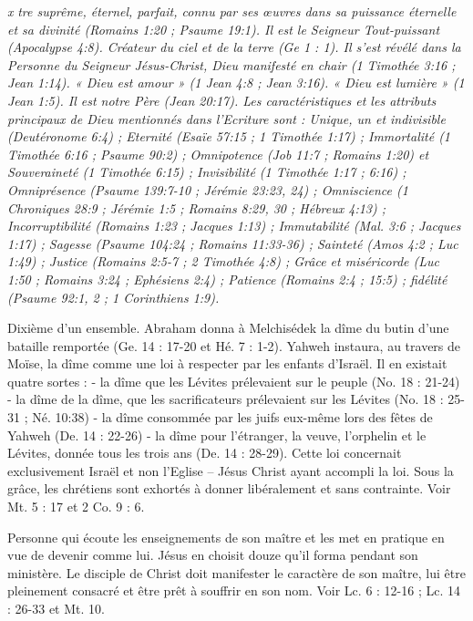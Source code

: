 \begin{multicols}{2}
\textit{x}\newline
{}\textit{tre suprême, éternel, parfait, connu par ses œuvres dans sa puissance éternelle et sa divinité (Romains 1:20 ; Psaume 19:1). Il est le Seigneur Tout-puissant (Apocalypse 4:8). Créateur du ciel et de la terre (Ge 1 : 1). Il s'est révélé dans la Personne du Seigneur Jésus-Christ, Dieu manifesté en chair (1 Timothée 3:16 ; Jean 1:14). « Dieu est amour » (1 Jean 4:8 ; Jean 3:16). « Dieu est lumière » (1 Jean 1:5). Il est notre Père (Jean 20:17). Les caractéristiques et les attributs principaux de Dieu mentionnés dans l'Ecriture sont : Unique, un et indivisible (Deutéronome 6:4) ; Eternité (Esaïe 57:15 ; 1 Timothée 1:17) ; Immortalité (1 Timothée 6:16 ; Psaume 90:2) ; Omnipotence (Job 11:7 ; Romains 1:20) et Souveraineté (1 Timothée 6:15) ; Invisibilité (1 Timothée 1:17 ; 6:16) ; Omniprésence (Psaume 139:7-10 ; Jérémie 23:23, 24) ; Omniscience (1 Chroniques 28:9 ; Jérémie 1:5 ; Romains 8:29, 30 ; Hébreux 4:13) ; Incorruptibilité (Romains 1:23 ; Jacques 1:13) ; Immutabilité (Mal. 3:6 ; Jacques 1:17) ; Sagesse (Psaume 104:24 ; Romains 11:33-36) ; Sainteté (Amos 4:2 ; Luc 1:49) ; Justice (Romains 2:5-7 ; 2 Timothée 4:8) ; Grâce et miséricorde (Luc 1:50 ; Romains 3:24 ; Ephésiens 2:4) ; Patience (Romains 2:4 ; 15:5) ; fidélité (Psaume 92:1, 2 ; 1 Corinthiens 1:9).}\newline

\textit{}\newline
Dixième d’un ensemble. Abraham donna à Melchisédek la dîme du butin d'une bataille remportée (Ge. 14 : 17-20 et Hé. 7 : 1-2). Yahweh instaura, au travers de Moïse, la dîme comme une loi à respecter par les enfants d’Israël. Il en existait quatre sortes :
- la dîme que les Lévites prélevaient sur le peuple (No. 18 : 21-24)
- la dîme de la dîme, que les sacrificateurs prélevaient sur les Lévites (No. 18 : 25-31 ; Né. 10:38)
- la dîme consommée par les juifs eux-même lors des fêtes de Yahweh (De. 14 : 22-26)
- la dîme pour l’étranger, la veuve, l’orphelin et le Lévites, donnée tous les trois ans (De. 14 : 28-29).
Cette loi concernait exclusivement Israël et non l’Eglise – Jésus Christ ayant accompli la loi. Sous la grâce, les chrétiens sont exhortés à donner libéralement et sans contrainte. Voir Mt. 5 : 17 et 2 Co. 9 : 6.

\textit{}\newline
Personne qui écoute les enseignements de son maître et les met en pratique en vue de devenir comme lui. Jésus en choisit douze qu’il forma pendant son ministère. Le disciple de Christ doit manifester le caractère de son maître, lui être pleinement consacré et être prêt à souffrir en son nom. Voir Lc. 6 : 12-16 ; Lc. 14 : 26-33 et Mt. 10.


\end{multicols}
